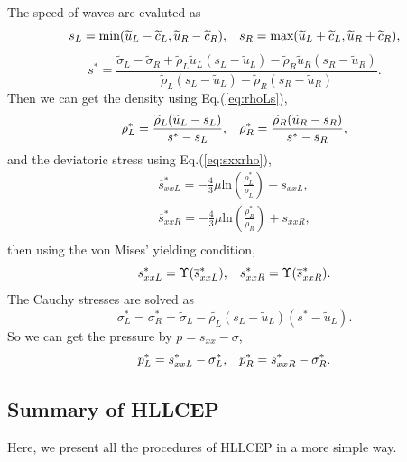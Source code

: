 \documentclass{article}
\numberwithin{equation}{section}
\numberwithin{table}{section}
\begin{document}
The speed of waves are evaluted as
\begin{equation}
  s_L = \text{min} (\widetilde{u}_L-\widetilde{c}_L, \widetilde{u}_R-\widetilde{c}_R), \hspace{0.3cm} s_R = \text{max}(\widetilde{u}_L+\widetilde{c}_L, \widetilde{u}_R+\widetilde{c}_R),
	\end{equation}
	\begin{equation}
	  s^* = \frac{\widetilde{\sigma}_L-\widetilde{\sigma}_R+\widetilde{\rho}_L \widetilde{u}_L(s_L-\widetilde{u}_L)-\widetilde{\rho}_R \widetilde{u}_R(s_R-\widetilde{u}_R)}{\widetilde{\rho}_L(s_L-\widetilde{u}_L)-\widetilde{\rho}_R(s_R-\widetilde{u}_R)}.
\end{equation}
Then we can get the density using Eq.(\ref{eq:rhoLs}),
\begin{equation}
  \rho_L^* = \frac{\widetilde{\rho}_L(\widetilde{u}_L-s_L)}{s^*-s_L}, \hspace{0.3cm}  \rho_R^* = \frac{\widetilde{\rho}_R(\widetilde{u}_R-s_R)}{s^*-s_R},
\end{equation}
and the deviatoric stress using Eq.(\ref{eq:sxxrho}),
  \begin{align}
  \overline{s}_{xxL}^* =  -\frac{4}{3}\mu \text{ln}\left( \frac{\rho_L^*}{\rho_L}  \right)+s_{xxL},\\
  \overline{s}_{xxR}^* =  -\frac{4}{3}\mu \text{ln}\left( \frac{\rho_R^*}{\rho_R}  \right)+s_{xxR},\\
\end{align}
then using  the von Mises' yielding condition,
\begin{equation}
  s_{xxL}^* = \Upsilon(\overline{s}_{xxL}^*) , \hspace{0.3cm}  s_{xxR}^* = \Upsilon(\overline{s}_{xxR}^*).
\end{equation}
The Cauchy stresses  are solved as 
\begin{equation}
  \sigma_L^*=\sigma_R^*=\widetilde{\sigma}_L -\widetilde{\rho_L} (s_L-\widetilde{u}_L)(s^*-\widetilde{u}_L).
\end{equation}
So we can get the pressure by $p =s_{xx}-\sigma$,
\begin{equation}
  p_L^* = s_{xxL}^* - \sigma_L^*, \hspace{0.3cm}   p_R^* = s_{xxR}^* - \sigma_R^*.
\end{equation}


\subsection{Summary of HLLCEP}
Here, we present all the procedures of HLLCEP in  a more simple way.
\end{document}

